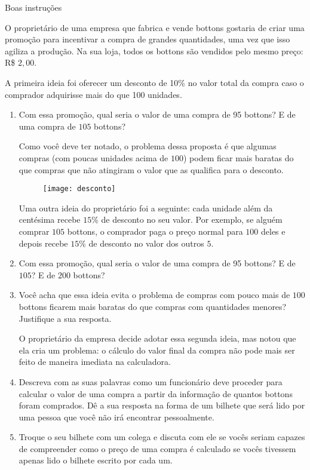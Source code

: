 \begin{task}{Boas instruções}
\label{comp-task1}

O proprietário de uma empresa que fabrica e vende bottons gostaria de criar uma promoção para incentivar a compra de grandes quantidades, uma vez que isso agiliza a produção. Na sua loja, todos os bottons são vendidos pelo mesmo preço: R\$ $2,00$.

A primeira ideia foi oferecer um desconto de 10\% no valor total da compra caso o comprador adquirisse mais do que 100 unidades.

\begin{enumerate}
\item Com essa promoção, qual seria o valor de uma compra de 95 bottons? E de uma compra de $105$ bottons?

Como você deve ter notado, o problema dessa proposta é que algumas compras (com poucas unidades acima de $100$) podem ficar mais baratas do que compras que não atingiram o valor que as qualifica para o desconto.

\begin{figure}[H]
\centering

\texttt{[image: desconto]}
\end{figure}

Uma outra ideia do proprietário foi a seguinte: cada unidade além da centésima recebe $15\%$ de desconto no seu valor. Por exemplo, se alguém comprar $105$ bottons, o comprador paga o preço normal para $100$ deles e depois recebe $15\%$ de desconto no valor dos outros $5$.

\item Com essa promoção, qual seria o valor de uma compra de 95 bottons? E de $105$? E de $200$ bottons?

\item Você acha que essa ideia evita o problema de compras com pouco mais de $100$ bottons ficarem mais baratas do que compras com quantidades menores? Justifique a sua resposta.

O proprietário da empresa decide adotar essa segunda ideia, mas notou que ela cria um problema: o cálculo do valor final da compra não pode mais ser feito de maneira imediata na calculadora.

\item Descreva com as suas palavras como um funcionário deve proceder para calcular o valor de uma compra a partir da informação de quantos bottons foram comprados. Dê a sua resposta na forma de um bilhete que será lido por uma pessoa que você não irá encontrar pessoalmente.

\item Troque o seu bilhete com um colega e discuta com ele se vocês seriam capazes de compreender como o preço de uma compra é calculado se vocês tivessem apenas lido o bilhete escrito por cada um.
\end{enumerate}

\end{task}
\clearpage


